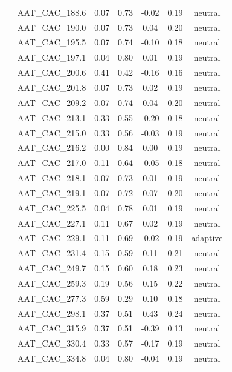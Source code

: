 \documentclass[11pt,]{article}
\begin{document}
\begin{longtable}[c]{@{}lcccccc@{}}
& AAT\_CAC\_188.6 & 0.07 & 0.73 & -0.02 & 0.19 & neutral
\\\addlinespace
& AAT\_CAC\_190.0 & 0.07 & 0.73 & 0.04 & 0.20 & neutral
\\\addlinespace
& AAT\_CAC\_195.5 & 0.07 & 0.74 & -0.10 & 0.18 & neutral
\\\addlinespace
& AAT\_CAC\_197.1 & 0.04 & 0.80 & 0.01 & 0.19 & neutral
\\\addlinespace
& AAT\_CAC\_200.6 & 0.41 & 0.42 & -0.16 & 0.16 & neutral
\\\addlinespace
& AAT\_CAC\_201.8 & 0.07 & 0.73 & 0.02 & 0.19 & neutral
\\\addlinespace
& AAT\_CAC\_209.2 & 0.07 & 0.74 & 0.04 & 0.20 & neutral
\\\addlinespace
& AAT\_CAC\_213.1 & 0.33 & 0.55 & -0.20 & 0.18 & neutral
\\\addlinespace
& AAT\_CAC\_215.0 & 0.33 & 0.56 & -0.03 & 0.19 & neutral
\\\addlinespace
& AAT\_CAC\_216.2 & 0.00 & 0.84 & 0.00 & 0.19 & neutral
\\\addlinespace
& AAT\_CAC\_217.0 & 0.11 & 0.64 & -0.05 & 0.18 & neutral
\\\addlinespace
& AAT\_CAC\_218.1 & 0.07 & 0.73 & 0.01 & 0.19 & neutral
\\\addlinespace
& AAT\_CAC\_219.1 & 0.07 & 0.72 & 0.07 & 0.20 & neutral
\\\addlinespace
& AAT\_CAC\_225.5 & 0.04 & 0.78 & 0.01 & 0.19 & neutral
\\\addlinespace
& AAT\_CAC\_227.1 & 0.11 & 0.67 & 0.02 & 0.19 & neutral
\\\addlinespace
& AAT\_CAC\_229.1 & 0.11 & 0.69 & -0.02 & 0.19 & adaptive
\\\addlinespace
& AAT\_CAC\_231.4 & 0.15 & 0.59 & 0.11 & 0.21 & neutral
\\\addlinespace
& AAT\_CAC\_249.7 & 0.15 & 0.60 & 0.18 & 0.23 & neutral
\\\addlinespace
& AAT\_CAC\_259.3 & 0.19 & 0.56 & 0.15 & 0.22 & neutral
\\\addlinespace
& AAT\_CAC\_277.3 & 0.59 & 0.29 & 0.10 & 0.18 & neutral
\\\addlinespace
& AAT\_CAC\_298.1 & 0.37 & 0.51 & 0.43 & 0.24 & neutral
\\\addlinespace
& AAT\_CAC\_315.9 & 0.37 & 0.51 & -0.39 & 0.13 & neutral
\\\addlinespace
& AAT\_CAC\_330.4 & 0.33 & 0.57 & -0.17 & 0.19 & neutral
\\\addlinespace
& AAT\_CAC\_334.8 & 0.04 & 0.80 & -0.04 & 0.19 & neutral

\end{longtable}
\end{document}

